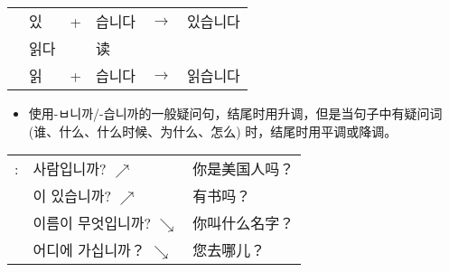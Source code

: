 \begin{grammar}
\begin{grammarsect}
\begin{tabular}{llllll}
            &\kr 있&+&\kr 습니다&$\to$&\kr 있습니다\\
            &\kr 읽다&&读\\
            &\kr 읽&+&\kr 습니다&$\to$&\kr 읽습니다\\
        \end{tabular}
    \end{grammarsect}
    \begin{itemize}
        \item 使用{\kr -ㅂ니까/-습니까}的一般疑问句，结尾时用升调，但是当句子中有疑问词 (谁、什么、什么时候、为什么、怎么) 时，结尾时用平调或降调。
    \end{itemize}
    \begin{tabular}{lll}
            \kr \ruby{例}{예}:&\kr \ruby{美國}{미국} 사람입니까? $\nearrow$&你是美国人吗？\\
            &\kr \ruby{冊}{책}이 있습니까? $\nearrow$&有书吗？\\
            &\kr 이름이 무엇입니까? $\searrow$&你叫什么名字？\\
            &\kr 어디에 가십니까？ $\searrow$&您去哪儿？
        \end{tabular}\\
\end{grammar}
